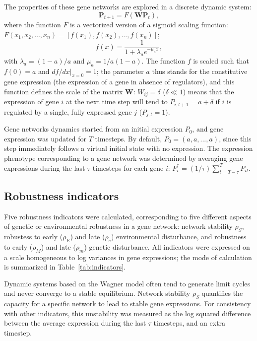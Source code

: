 \documentclass[10pt,a4paper]{article}
\newcommand{\stability}{{\rho_S}}
\newcommand{\earlyenv}{{\rho_E}}
\newcommand{\lateenv}{{\rho_e}}
\newcommand{\earlymut}{{\rho_M}}
\newcommand{\latemut}{{\rho_m}}
\begin{document}
The properties of these gene networks are explored in a discrete dynamic system:
\begin{equation}
 \bm P_{t+1} = F(\bm W \bm P_t),
\end{equation}
\noindent where the function $F$ is a vectorized version of a sigmoid scaling function: $F(x_1, x_2, \dots, x_n) = [f(x_1), f(x_2), \dots, f(x_n)]$;
\begin{equation} \label{eq:fx}
f(x) = \frac{1}{1+ \lambda_a e ^{- \mu_a x}}, 
\end{equation}
\noindent with $\lambda_a = (1-a)/a$ and $\mu_a = 1/a(1-a)$. The function $f$ is scaled such that $f(0) = a$ and $df/dx|_{x=0}=1$; the parameter $a$ thus stands for the constitutive gene expression (the expression of a gene in absence of regulators), and this function defines the scale of the matrix $\bm W$: $W_{ij} = \delta$ ($\delta \ll 1$) means that the expression of gene $i$ at the next time step will tend to $P_{i,t+1} = a + \delta$ if $i$ is regulated by a single, fully expressed gene $j$ ($P_{j,t} = 1$).

Gene networks dynamics started from an initial expression $P_0$, and gene expression was updated for $T$ timesteps. By default, $P_0 = (a, a, ..., a)$, since this step immediately follows a virtual initial state with no expression. The expression phenotype corresponding to a gene network was determined by averaging gene expressions during the last $\tau$ timesteps for each gene $i$: $P_i^* = (1/\tau)\sum_{t=T-\tau}^T P_{it}$. 

\subsection{Robustness indicators}

Five robustness indicators were calculated, corresponding to five different aspects of genetic or environmental robustness in a gene network: network stability $\stability$, robustess to early ($\earlyenv$) and late ($\lateenv$) environmental disturbance, and robustness to early ($\earlymut$) and late ($\latemut$) genetic disturbance. All indicators were expressed on a scale homogeneous to log variances in gene expressions; the mode of calculation is summarized in Table~\ref{tab:indicators}. 

Dynamic systems based on the Wagner model often tend to generate limit cycles and never converge to a stable equilibrium. Network stability $\stability$ quantifies the capacity for a specific network to lead to stable gene expressions.  For consistency with other indicators, this unstability was measured as the log squared difference between the average expression during the last $\tau$ timesteps, and an extra timestep. 
\end{document}
